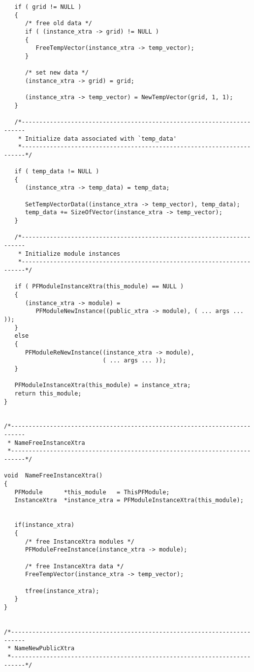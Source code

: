 \begin{verbatim}
   if ( grid != NULL )
   {
      /* free old data */
      if ( (instance_xtra -> grid) != NULL )
      {
         FreeTempVector(instance_xtra -> temp_vector);
      }

      /* set new data */
      (instance_xtra -> grid) = grid;

      (instance_xtra -> temp_vector) = NewTempVector(grid, 1, 1);
   }

   /*-----------------------------------------------------------------------
    * Initialize data associated with `temp_data'
    *-----------------------------------------------------------------------*/

   if ( temp_data != NULL )
   {
      (instance_xtra -> temp_data) = temp_data;

      SetTempVectorData((instance_xtra -> temp_vector), temp_data);
      temp_data += SizeOfVector(instance_xtra -> temp_vector);
   }

   /*-----------------------------------------------------------------------
    * Initialize module instances
    *-----------------------------------------------------------------------*/

   if ( PFModuleInstanceXtra(this_module) == NULL )
   {
      (instance_xtra -> module) =
         PFModuleNewInstance((public_xtra -> module), ( ... args ... ));
   }
   else
   {
      PFModuleReNewInstance((instance_xtra -> module),
                            ( ... args ... ));
   }

   PFModuleInstanceXtra(this_module) = instance_xtra;
   return this_module;
}


/*--------------------------------------------------------------------------
 * NameFreeInstanceXtra
 *--------------------------------------------------------------------------*/

void  NameFreeInstanceXtra()
{
   PFModule      *this_module   = ThisPFModule;
   InstanceXtra  *instance_xtra = PFModuleInstanceXtra(this_module);


   if(instance_xtra)
   {
      /* free InstanceXtra modules */
      PFModuleFreeInstance(instance_xtra -> module);

      /* free InstanceXtra data */
      FreeTempVector(instance_xtra -> temp_vector);

      tfree(instance_xtra);
   }
}


/*--------------------------------------------------------------------------
 * NameNewPublicXtra
 *--------------------------------------------------------------------------*/


\end{verbatim}
